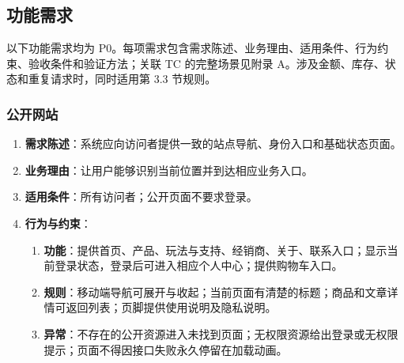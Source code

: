 \subsection{功能需求}\label{sec:32-功能需求}

以下功能需求均为 P0。每项需求包含需求陈述、业务理由、适用条件、行为约束、验收条件和验证方法；关联 TC 的完整场景见附录 A。涉及金额、库存、状态和重复请求时，同时适用第 3.3 节规则。

\subsubsection{公开网站}\label{sec:321-公开网站}


\begin{enumerate}
\item {\bfseries 需求陈述}：系统应向访问者提供一致的站点导航、身份入口和基础状态页面。
\item {\bfseries 业务理由}：让用户能够识别当前位置并到达相应业务入口。
\item {\bfseries 适用条件}：所有访问者；公开页面不要求登录。
\item {\bfseries 行为与约束}：
\begin{enumerate}
\item {\bfseries 功能}：提供首页、产品、玩法与支持、经销商、关于、联系入口；显示当前登录状态，登录后可进入相应个人中心；提供购物车入口。
\item {\bfseries 规则}：移动端导航可展开与收起；当前页面有清楚的标题；商品和文章详情可返回列表；页脚提供使用说明及隐私说明。
\item {\bfseries 异常}：不存在的公开资源进入未找到页面；无权限资源给出登录或无权限提示；页面不得因接口失败永久停留在加载动画。
\end{enumerate}

\end{enumerate}


